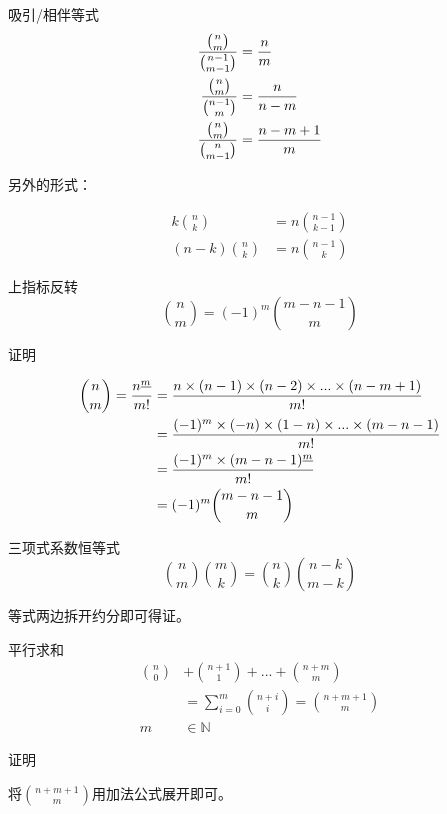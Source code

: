 \documentclass[UTF8]{beamer}
\begin{document}
  \begin{frame}
    \begin{block}{吸引/相伴等式}
      $$
      \begin{aligned}
      {{n \choose m} \over {n-1 \choose m-1}}&={{n} \over {m}} \\
      {{n \choose m} \over {n-1 \choose m}}&={{n} \over {n-m}} \\
      {{n \choose m} \over {n \choose m-1}}&={{n-m+1} \over {m}} \\
      \end{aligned}
      $$

      \pause
      另外的形式：

      $$
      \begin{aligned}
      k {n \choose k}&=n {n-1 \choose k-1} \\
      (n-k){n \choose k}&=n{n-1 \choose k}
      \end{aligned}
      $$
    \end{block}
  \end{frame}

    \begin{frame}
      \begin{block}{上指标反转}
        $$
        {n \choose m}=(-1)^m{m-n-1 \choose m}
        $$
      \end{block}
      \pause
      证明

      $$
      \begin{aligned}
      {n \choose m}={n^{\underline{m}} \over m!}&={n\times(n-1)\times (n-2)\times...\times (n-m+1) \over m!} \\
      &={(-1)^m\times (-n)\times(1-n)\times...\times(m-n-1) \over m!} \\
      &={(-1)^m\times (m-n-1)^{\underline{m}} \over m!} \\
      &=(-1)^m{m-n-1 \choose m}
      \end{aligned}
      $$
    \end{frame}

    \begin{frame}
      \begin{block}{三项式系数恒等式}
        $$
        {n \choose m}{m \choose k}={n \choose k}{n-k \choose m-k}
        $$

        等式两边拆开约分即可得证。
      \end{block}
      \pause
      \begin{block}{平行求和}
        $$
        \begin{aligned}
        {n \choose 0}&+{n+1 \choose 1}+...+{n+m \choose m} \\
        &=\sum\limits_{i=0}^{m}{n+i \choose i}={n+m+1 \choose m} \\
        m &\in \mathbb{N}
        \end{aligned}
        $$

        证明

        将${n+m+1 \choose m}$用加法公式展开即可。
      \end{block}
    \end{frame}
\end{document}
